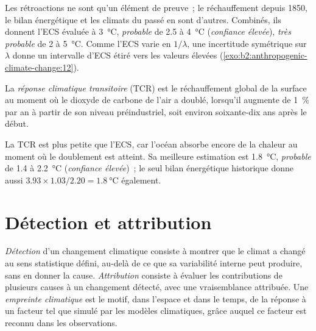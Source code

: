 Les rétroactions ne sont qu'un élément de preuve~; le réchauffement depuis 1850, le bilan énergétique
et les climats du passé en sont d'autres. Combinés, ils donnent l'ECS évaluée à \qty{3}{\celsius},
\emph{probable} de 2.5 à \qty{4}{\celsius} (\emph{confiance élevée}), \emph{très probable} de 2 à
\qty{5}{\celsius}. Comme l'ECS varie en $1/\lambda$, une incertitude symétrique sur $\lambda$ donne
un intervalle d'ECS étiré vers les valeurs élevées (\cref{exo:b2:anthropogenic-climate-change:12}).

\begin{definition}\label{def:b2:anthropogenic-climate-change:tcr}
La \emph{réponse climatique transitoire} (TCR) est le réchauffement
global de la surface au moment où le dioxyde de carbone de l'air a doublé, lorsqu'il augmente de
\qty{1}{\percent} par an à partir de son niveau préindustriel, soit environ soixante-dix ans après le début.
\end{definition}

La TCR est plus petite que l'ECS, car l'océan absorbe encore de la chaleur au moment où le doublement est
atteint. Sa meilleure estimation est \qty{1.8}{\celsius}, \emph{probable} de 1.4 à \qty{2.2}{\celsius}
(\emph{confiance élevée})~; le seul bilan énergétique historique donne aussi $3.93 \times 1.03/2.20 =
\qty{1.8}{\celsius}$ également.

\section{Détection et attribution}\label{sec:b2:anthropogenic-climate-change:attribution}

\begin{definition}\label{def:b2:anthropogenic-climate-change:da}
\emph{Détection} d'un changement climatique consiste à montrer que le climat a changé
au sens statistique défini, au-delà de ce que sa variabilité interne peut produire, sans en donner la
cause. \emph{Attribution} consiste à évaluer les contributions de plusieurs causes à
un changement détecté, avec une vraisemblance attribuée. Une \emph{empreinte climatique}
est le motif, dans l'espace et dans le temps, de la réponse à un facteur tel que simulé par
les modèles climatiques, grâce auquel ce facteur est reconnu dans les observations.
\end{definition}

